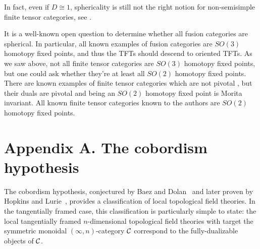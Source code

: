 \documentclass{amsart}
\begin{document}
In fact, even if $D \cong 1$, sphericality is still not the right notion for non-semisimple finite tensor categories, see \cite[Rem. 7.5]{MR2097289}.

\begin{remark}
It is a well-known open question to determine whether all fusion categories are spherical.  In particular, all known examples of fusion categories are $SO(3)$ homotopy fixed points, and thus the TFTs should descend to oriented TFTs.  As we saw above, not all finite tensor categories are $SO(3)$ homotopy fixed points, but one could ask whether they're at least all $SO(2)$ homotopy fixed points.  There are known examples of finite tensor categories which are not pivotal \cite[Rem. 2.11]{1204.5807}, but their duals are pivotal and being an $SO(2)$ homotopy fixed point is Morita invariant.  All known finite tensor categories known to the authors are $SO(2)$ homotopy fixed points.
\end{remark}


\renewcommand{\theapptheorem}{A.\arabic{apptheorem}}
\setcounter{apptheorem}{0}


\nopagebreak
{}
\section*{Appendix A. The cobordism hypothesis} \label{app:ch}

The cobordism hypothesis, conjectured by Baez and Dolan~\cite{MR1355899} and later proven by Hopkins and Lurie~\cite{lurie-ch}, provides a classification of local topological field theories.  In the tangentially framed case, this classification is particularly simple to state: the local tangentially framed $n$-dimensional topological field theories with target the symmetric monoidal $(\infty,n)$-category $\mathcal C$ correspond to the fully-dualizable objects of $\mathcal C$.  
\end{document}
